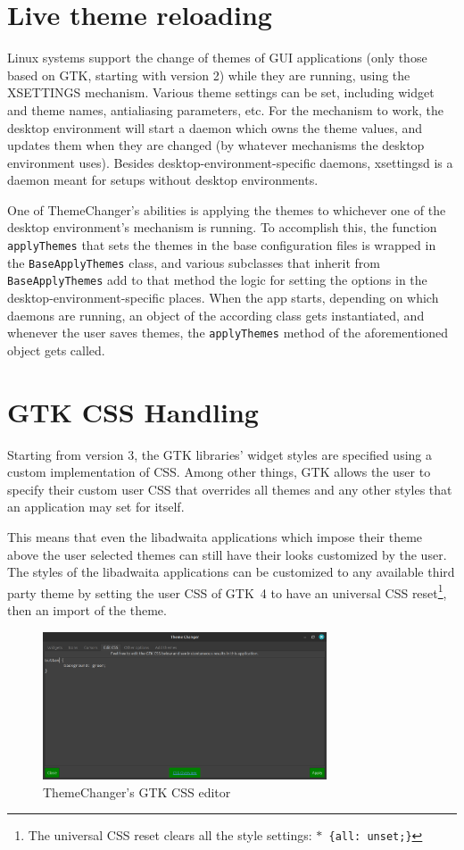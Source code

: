 \documentclass{article}
\begin{document}
\section{Live theme reloading}
Linux systems support the change of themes of GUI applications (only those based on GTK, starting with version 2) while they are running, using the XSETTINGS mechanism\cite{xsettings}.
Various theme settings can be set, including widget and theme names, antialiasing parameters, etc.
For the mechanism to work, the desktop environment will start a daemon which owns the theme values, and updates them when they are changed (by whatever mechanisms the desktop environment uses).
Besides desktop-environment-specific daemons, xsettingsd is a daemon meant for setups without desktop environments.

One of ThemeChanger's abilities is applying the themes to whichever one of the  desktop environment's mechanism is running.
To accomplish this, the function \verb|applyThemes| that sets the themes in the base configuration files is wrapped in the \verb|BaseApplyThemes| class, and various subclasses that inherit from \verb|BaseApplyThemes| add to that method the logic for setting the options in the desktop-environment-specific places.
When the app starts, depending on which daemons are running, an object of the according class gets instantiated, and whenever the user saves themes, the \verb|applyThemes| method of the aforementioned object gets called.

\section{GTK CSS Handling}
Starting from version 3, the GTK libraries' widget styles are specified using a custom implementation of CSS\cite{gtk3css}.
Among other things, GTK allows the user to specify their custom user CSS that overrides all themes and any other styles that an application may set for itself.

This means that even the libadwaita applications which impose their theme above the user selected themes can still have their looks customized by the user.
The styles of the libadwaita applications can be customized to any available third party theme by setting the user CSS of GTK~4 to have an universal CSS reset\footnote{The universal CSS reset clears all the style settings: \texttt{$*$ \{all: unset;\}}}, then an import of the theme.

\begin{figure}[h]
    \centering
    \includegraphics[width=0.75\textwidth]{screenshot2.png}
    \caption{ThemeChanger's GTK CSS editor}
    \label{fig:screenshot2}
\end{figure}
\end{document}
